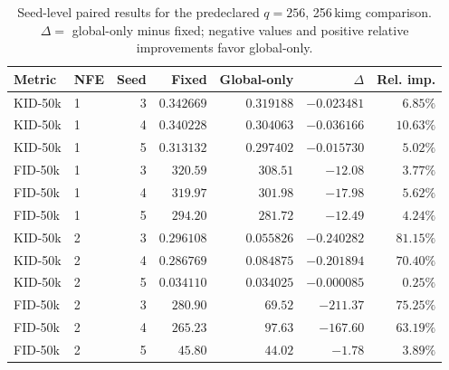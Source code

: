 \begin{table}[t]
  \centering
  \caption{Seed-level paired results for the predeclared $q=256$, 256\,kimg
  comparison. $\Delta=$ global-only minus fixed; negative values and positive
  relative improvements favor global-only.}
  \label{tab:q256-256k-per-seed}
  \small
  \setlength{\tabcolsep}{5pt}
  \begin{tabular}{llrrrrr}
    \toprule
    Metric & NFE & Seed & Fixed & Global-only & $\Delta$ & Rel. imp. \\
    \midrule
    KID-50k & 1 & 3 & $0.342669$ & $0.319188$ & $-0.023481$ & $6.85\%$ \\
    KID-50k & 1 & 4 & $0.340228$ & $0.304063$ & $-0.036166$ & $10.63\%$ \\
    KID-50k & 1 & 5 & $0.313132$ & $0.297402$ & $-0.015730$ & $5.02\%$ \\
    FID-50k & 1 & 3 & $320.59$ & $308.51$ & $-12.08$ & $3.77\%$ \\
    FID-50k & 1 & 4 & $319.97$ & $301.98$ & $-17.98$ & $5.62\%$ \\
    FID-50k & 1 & 5 & $294.20$ & $281.72$ & $-12.49$ & $4.24\%$ \\
    \addlinespace
    KID-50k & 2 & 3 & $0.296108$ & $0.055826$ & $-0.240282$ & $81.15\%$ \\
    KID-50k & 2 & 4 & $0.286769$ & $0.084875$ & $-0.201894$ & $70.40\%$ \\
    KID-50k & 2 & 5 & $0.034110$ & $0.034025$ & $-0.000085$ & $0.25\%$ \\
    FID-50k & 2 & 3 & $280.90$ & $69.52$ & $-211.37$ & $75.25\%$ \\
    FID-50k & 2 & 4 & $265.23$ & $97.63$ & $-167.60$ & $63.19\%$ \\
    FID-50k & 2 & 5 & $45.80$ & $44.02$ & $-1.78$ & $3.89\%$ \\
    \bottomrule
  \end{tabular}
\end{table}
